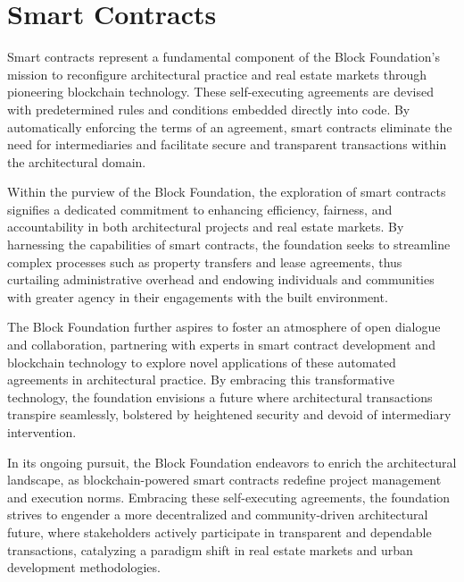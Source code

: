 \newpage
\section{Smart Contracts}

Smart contracts represent a fundamental component of the Block Foundation's mission to reconfigure architectural practice and real estate markets through pioneering blockchain technology. These self-executing agreements are devised with predetermined rules and conditions embedded directly into code. By automatically enforcing the terms of an agreement, smart contracts eliminate the need for intermediaries and facilitate secure and transparent transactions within the architectural domain.

Within the purview of the Block Foundation, the exploration of smart contracts signifies a dedicated commitment to enhancing efficiency, fairness, and accountability in both architectural projects and real estate markets. By harnessing the capabilities of smart contracts, the foundation seeks to streamline complex processes such as property transfers and lease agreements, thus curtailing administrative overhead and endowing individuals and communities with greater agency in their engagements with the built environment.

The Block Foundation further aspires to foster an atmosphere of open dialogue and collaboration, partnering with experts in smart contract development and blockchain technology to explore novel applications of these automated agreements in architectural practice. By embracing this transformative technology, the foundation envisions a future where architectural transactions transpire seamlessly, bolstered by heightened security and devoid of intermediary intervention.

In its ongoing pursuit, the Block Foundation endeavors to enrich the architectural landscape, as blockchain-powered smart contracts redefine project management and execution norms. Embracing these self-executing agreements, the foundation strives to engender a more decentralized and community-driven architectural future, where stakeholders actively participate in transparent and dependable transactions, catalyzing a paradigm shift in real estate markets and urban development methodologies.
